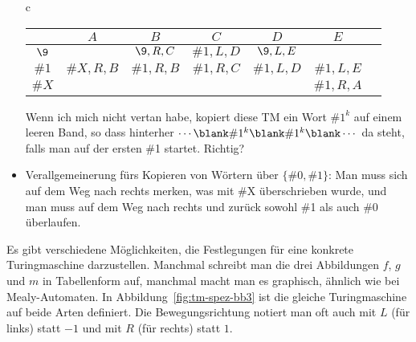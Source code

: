 \begin{tutorium}
\begin{itemize}
\begin{center}
\begin{tabular}{c}
\begin{tabular}[t]{>{$}c<{$}@{\qquad}*{6}{>{$}c<{$}}}
          & A       & B      & C       & D       & E \\
          \midrule
          \9       
          &         & \9,R,C & \#1,L,D & \9,L,E  &  \\
          \#1         & \#X,R,B & \#1,R,B& \#1,R,C & \#1,L,D & \#1,L,E \\
          \#X         &         &        &         &         & \#1,R,A \\
          \bottomrule
        \end{tabular}
      \end{tabular}
    \end{center}
    Wenn ich mich nicht vertan habe, kopiert diese TM ein Wort
    $\#1^k$ auf einem leeren Band, so dass hinterher $\cdots \blank
    \#1^k \blank \#1^k \blank \cdots$ da steht, falls man auf der
    ersten \#1 startet. Richtig?
  \item Verallgemeinerung fürs Kopieren von Wörtern über $\{\#0,\#1\}$:
    Man muss sich auf dem Weg nach rechts merken, was mit \#X
    überschrieben wurde, und man muss auf dem Weg nach rechts und
    zurück sowohl \#1 als auch \#0 überlaufen.
  \end{itemize}
\end{tutorium}

Es gibt verschiedene Möglichkeiten, die Festlegungen für eine konkrete
Turingmaschine darzustellen. Manchmal schreibt man die drei
Abbildungen $f$, $g$ und $m$ in Tabellenform auf, manchmal macht man
es graphisch, ähnlich wie bei Mealy-Automaten.  In
Abbildung~\ref{fig:tm-spez-bb3} ist die gleiche Turingmaschine auf beide
Arten definiert. Die Bewegungsrichtung notiert man oft auch mit $L$
(für links) statt $-1$ und mit $R$ (für rechts) statt $1$.


